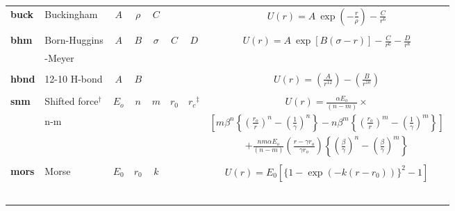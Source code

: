 \begin{enumerate}
\begin{table}[htbp]
\begin{centering}
\begin{tabular}{|l|l|c|c|c|c|c|c|}
{\bf buck} & Buckingham                & $A$        & $\rho$   & $C$      &         &                      &
$U(r) = A~\exp \left( -\frac{r}{\rho} \right) - \frac{C}{r^{6}}$ \\
           &                           &            &          &          &         &                      & \\
{\bf bhm}  & Born-Huggins              & $A$        & $B$      & $\sigma$ & $C$     & $D$                  &
$U(r)=A~\exp[B(\sigma-r)]-\frac{C}{r^{6}}-\frac{D}{r^{8}}$\\
           & -Meyer                    &            &          &          &         &                      & \\
           &                           &            &          &          &         &                      & \\
{\bf hbnd} & 12-10 H-bond              & $A$        & $B$      &          &         &                      &
$U(r) = \left( \frac{A}{r^{12}} \right) - \left( \frac{B}{r^{10}} \right)$ \\
           &                           &            &          &          &         &                      & \\
{\bf snm}  & Shifted force$^{\dagger}$ & $E_{o}$    & $n$      & $m$      & $r_{0}$ & $r_{c}$$^{\ddagger}$ &
$U(r) = \frac{\alpha E_{o}}{(n-m)}\times$ \\
           & n-m \cite{mie-03a,clarke-86a} &        &          &          &         &                      &
$\left[ m\beta^{n} \left\{ \left( \frac{r_{o}}{r} \right)^{n} -
\left( \frac{1}{\gamma} \right)^{n} \right\} - n\beta^{m} \left\{
\left( \frac{r_{o}}{r} \right)^{m} - \left( \frac{1}{\gamma}
\right)^{m}\right\} \right]$ \\
           &                           &            &          &          &         &                      &
$+ \frac{nm\alpha E_{o}}{(n-m)} \left( \frac{r-\gamma r_{o}}
{\gamma r_{o}} \right) \left\{ \left( \frac{\beta}{\gamma}
\right)^{n} - \left( \frac{\beta}{\gamma} \right)^{m} \right\}$ \\
           &                           &            &          &          &         &                      & \\
{\bf mors} & Morse                     & $E_{0}$    & $r_{0}$  & $k$      &         &                      &
$U(r) = E_{0}[\{1-\exp(-k(r-r_{0}))\}^{2}-1]$ \\
           &                           &            &          &          &         &                      & \\
$$
\end{tabular}
\end{centering}
\end{table}
\end{enumerate}
